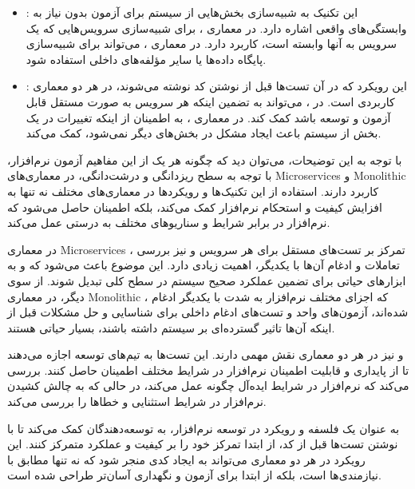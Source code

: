 \begin{itemize}
	\item {}: این تکنیک به شبیه‌سازی بخش‌هایی از سیستم برای آزمون بدون نیاز به وابستگی‌های واقعی اشاره دارد. در معماری 
	،
	برای شبیه‌سازی سرویس‌هایی که یک سرویس به آنها وابسته است، کاربرد دارد. در معماری 
	،
	می‌تواند برای شبیه‌سازی پایگاه داده‌ها یا سایر مؤلفه‌های داخلی استفاده شود.

	\item {}: این رویکرد که در آن تست‌ها قبل از نوشتن کد نوشته می‌شوند، در هر دو معماری کاربردی است. در 
	، 
	می‌تواند به تضمین اینکه هر سرویس به صورت مستقل قابل آزمون و توسعه باشد کمک کند. در معماری 
	،
	به اطمینان از اینکه تغییرات در یک بخش از سیستم باعث ایجاد مشکل در بخش‌های دیگر نمی‌شود، کمک می‌کند.

\end{itemize}

با توجه به این توضیحات، می‌توان دید که چگونه هر یک از این مفاهیم آزمون نرم‌افزار، با توجه به سطح ریزدانگی و درشت‌دانگی، در معماری‌های Microservices و Monolithic کاربرد دارند. استفاده از این تکنیک‌ها و رویکردها در معماری‌های مختلف نه تنها به افزایش کیفیت و استحکام نرم‌افزار کمک می‌کند، بلکه اطمینان حاصل می‌شود که نرم‌افزار در برابر شرایط و سناریوهای مختلف به درستی عمل می‌کند.

در معماری Microservices ، تمرکز بر تست‌های مستقل برای هر سرویس و نیز بررسی تعاملات و ادغام آن‌ها با یکدیگر، اهمیت زیادی دارد. این موضوع باعث می‌شود که
و 
به ابزارهای حیاتی برای تضمین عملکرد صحیح سیستم در سطح کلی تبدیل شوند. از سوی دیگر، در معماری Monolithic ، که اجزای مختلف نرم‌افزار به شدت با یکدیگر ادغام شده‌اند، آزمون‌های واحد و تست‌های ادغام داخلی برای شناسایی و حل مشکلات قبل از اینکه آن‌ها تاثیر گسترده‌ای بر سیستم داشته باشند، بسیار حیاتی هستند.

و
نیز در هر دو معماری نقش مهمی دارند. این تست‌ها به تیم‌های توسعه اجازه می‌دهند تا از پایداری و قابلیت اطمینان نرم‌افزار در شرایط مختلف اطمینان حاصل کنند.
 بررسی می‌کند که نرم‌افزار در شرایط ایده‌آل چگونه عمل می‌کند، در حالی که
  به چالش کشیدن نرم‌افزار در شرایط استثنایی و خطاها را بررسی می‌کند.

به عنوان یک فلسفه و رویکرد در توسعه نرم‌افزار، به توسعه‌دهندگان کمک می‌کند تا با نوشتن تست‌ها قبل از کد، از ابتدا تمرکز خود را بر کیفیت و عملکرد متمرکز کنند. این رویکرد در هر دو معماری می‌تواند به ایجاد کدی منجر شود که نه تنها مطابق با نیازمندی‌ها است، بلکه از ابتدا برای آزمون و نگهداری آسان‌تر طراحی شده است.

